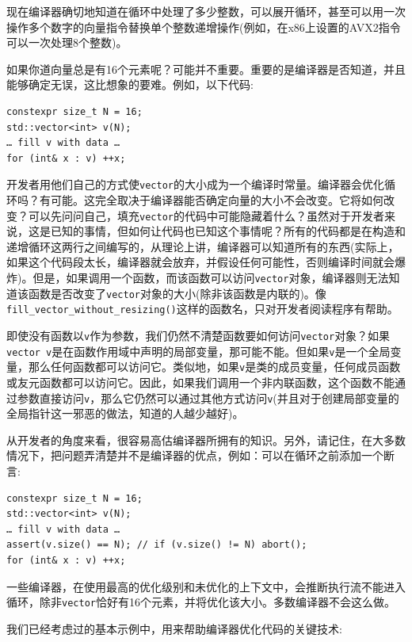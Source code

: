 现在编译器确切地知道在循环中处理了多少整数，可以展开循环，甚至可以用一次操作多个数字的向量指令替换单个整数递增操作(例如，在x86上设置的AVX2指令可以一次处理8个整数)。 

如果你道向量总是有16个元素呢？可能并不重要。重要的是编译器是否知道，并且能够确定无误，这比想象的要难。例如，以下代码:

\begin{lstlisting}[style=styleCXX]
constexpr size_t N = 16;
std::vector<int> v(N);
… fill v with data … 
for (int& x : v) ++x;
\end{lstlisting}

开发者用他们自己的方式使\texttt{vector}的大小成为一个编译时常量。编译器会优化循环吗？有可能。这完全取决于编译器能否确定向量的大小不会改变。它将如何改变？可以先问问自己，填充\texttt{vector}的代码中可能隐藏着什么？虽然对于开发者来说，这是已知的事情，但如何让代码也已知这个事情呢？所有的代码都是在构造和递增循环这两行之间编写的，从理论上讲，编译器可以知道所有的东西(实际上，如果这个代码段太长，编译器就会放弃，并假设任何可能性，否则编译时间就会爆炸)。但是，如果调用一个函数，而该函数可以访问\texttt{vector}对象，编译器则无法知道该函数是否改变了\texttt{vector}对象的大小(除非该函数是内联的)。像\texttt{fill\_vector\_without\_resizing()}这样的函数名，只对开发者阅读程序有帮助。 

即使没有函数以\texttt{v}作为参数，我们仍然不清楚函数要如何访问\texttt{vector}对象？如果\texttt{vector v}是在函数作用域中声明的局部变量，那可能不能。但如果\texttt{v}是一个全局变量，那么任何函数都可以访问它。类似地，如果\texttt{v}是类的成员变量，任何成员函数或友元函数都可以访问它。因此，如果我们调用一个非内联函数，这个函数不能通过参数直接访问\texttt{v}，那么它仍然可以通过其他方式访问\texttt{v}(并且对于创建局部变量的全局指针这一邪恶的做法，知道的人越少越好)。 

从开发者的角度来看，很容易高估编译器所拥有的知识。另外，请记住，在大多数情况下，把问题弄清楚并不是编译器的优点，例如：可以在循环之前添加一个断言:

\begin{lstlisting}[style=styleCXX]
constexpr size_t N = 16;
std::vector<int> v(N);
… fill v with data … 
assert(v.size() == N); // if (v.size() != N) abort();
for (int& x : v) ++x;
\end{lstlisting}

一些编译器，在使用最高的优化级别和未优化的上下文中，会推断执行流不能进入循环，除非\texttt{vector}恰好有16个元素，并将优化该大小。多数编译器不会这么做。

我们已经考虑过的基本示例中，用来帮助编译器优化代码的关键技术:

